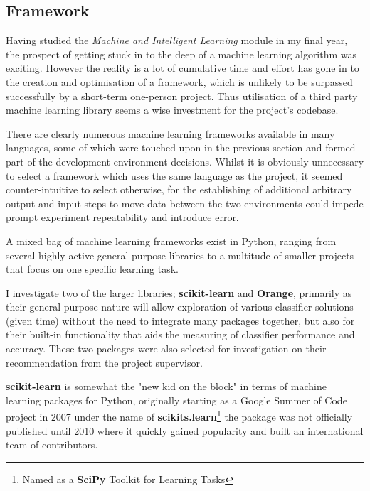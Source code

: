 \subsection{Framework}

Having studied the \textit{Machine and Intelligent Learning} module in my final
year, the prospect of getting stuck in to the deep of a machine learning
algorithm was exciting. However the reality is a lot of cumulative time and
effort has gone in to the creation and optimisation of a framework, which is
unlikely to be surpassed successfully by a short-term one-person project. Thus
utilisation of a third party machine learning library seems a wise investment
for the project's codebase.

There are clearly numerous machine learning frameworks available in many
languages, some of which were touched upon in the previous section and formed
part of the development environment decisions.
Whilst it is obviously unnecessary to select a framework which uses
the same language as the project, it seemed counter-intuitive to select otherwise,
for the establishing of additional arbitrary output and input steps to move data
between the two environments could impede prompt experiment repeatability and
introduce error.

A mixed bag of machine learning frameworks exist in Python\citep{py:for-ai},
ranging from several highly active general purpose libraries to a multitude of
smaller projects that focus on one specific learning task.

I investigate two of the larger libraries;
\textbf{scikit-learn}\citep{scikit-learn} and \textbf{Orange}\citep{orange},
primarily as their general purpose nature will allow exploration of various
classifier solutions (given time) without the need to integrate many packages
together, but also for their built-in functionality that aids the measuring of
classifier performance and accuracy. These two packages were also selected for
investigation on their recommendation from the project supervisor.


\textbf{scikit-learn} is somewhat the "new kid on the block" in terms of machine
learning packages for Python, originally starting as a Google Summer of Code
project in 2007 under the name of \textbf{scikits.learn}\footnote{Named as a
\textbf{SciPy} Toolkit for Learning Tasks} the package was not officially
published until 2010 where it quickly gained popularity and built an
international team of contributors\citep{about-scikit-learn}.

